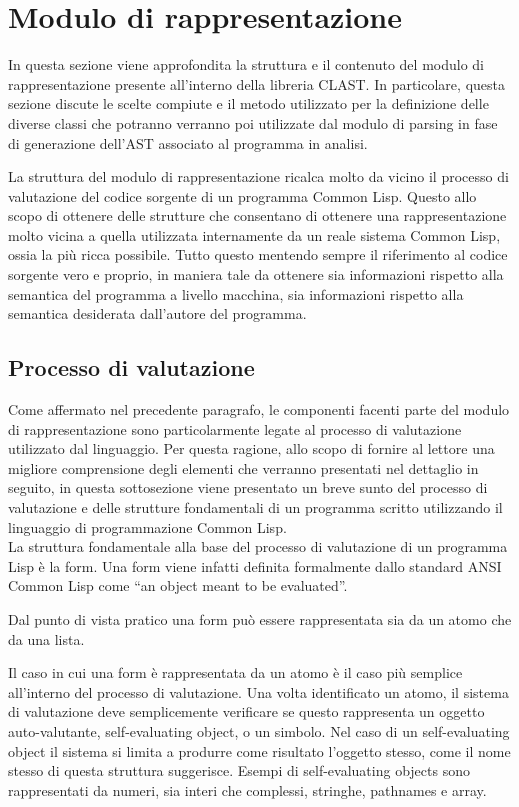 \section{Modulo di rappresentazione}

In questa sezione viene approfondita la struttura e il contenuto del modulo di
rappresentazione presente all'interno della libreria CLAST. In particolare,
questa sezione discute le scelte compiute e il metodo utilizzato per la
definizione delle diverse classi che potranno verranno poi utilizzate dal
modulo di parsing in fase di generazione dell'AST associato al programma in
analisi.

La struttura del modulo di rappresentazione ricalca molto da vicino il
processo di valutazione del codice sorgente di un programma Common Lisp.
Questo allo scopo di ottenere delle strutture che consentano di ottenere una
rappresentazione molto vicina a quella utilizzata internamente da un reale
sistema Common Lisp, ossia la più ricca possibile. Tutto questo mentendo
sempre il riferimento al codice sorgente vero e proprio, in maniera tale da
ottenere sia informazioni rispetto alla semantica del programma a livello
macchina, sia informazioni rispetto alla semantica desiderata dall’autore del
programma.

\subsection{Processo di valutazione}

Come affermato nel precedente paragrafo, le componenti facenti parte del
modulo di rappresentazione sono particolarmente legate al processo di
valutazione utilizzato dal linguaggio. Per questa ragione, allo scopo di
fornire al lettore una migliore comprensione degli elementi che verranno
presentati nel dettaglio in seguito, in questa sottosezione viene presentato
un breve sunto del processo di valutazione e delle strutture fondamentali di
un programma scritto utilizzando il linguaggio di programmazione Common
Lisp.\\

La struttura fondamentale alla base del processo di valutazione di un
programma Lisp è la form. Una form viene infatti definita formalmente dallo
standard ANSI Common Lisp come “an object meant to be evaluated”.

Dal punto di vista pratico una form può essere rappresentata sia da un atomo
che da una lista.

Il caso in cui una form è rappresentata da un atomo è il caso più semplice
all’interno del processo di valutazione. Una volta identificato un atomo, il
sistema di valutazione deve semplicemente verificare se questo rappresenta un
oggetto auto-valutante, self-evaluating object, o un simbolo. Nel caso di un
self-evaluating object il sistema si limita a produrre come risultato
l’oggetto stesso, come il nome stesso di questa struttura suggerisce. Esempi
di self-evaluating objects sono rappresentati da numeri, sia interi che
complessi, stringhe, pathnames e array.

